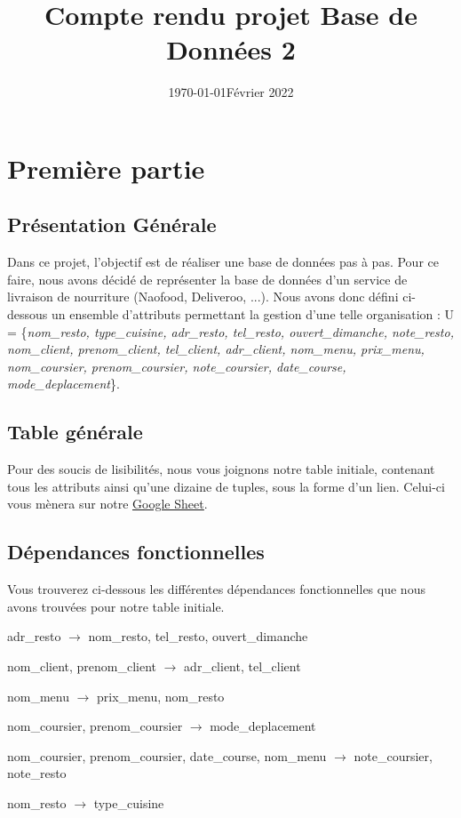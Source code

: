 \documentclass[french]{article}
\date{\today}
\title{Compte rendu projet Base de Données 2}
\author{\bsc{Billaud Maël} \and \bsc{Johan Quentin} \and \bsc{Ramé Tristan} \and \bsc{Goubon Valentin}}
\date{Février 2022}
\begin{document}


\maketitle

\section{Première partie}
    \subsection*{Présentation Générale}
        Dans ce projet, l'objectif est de réaliser une base de données pas à pas. Pour ce faire, nous avons décidé de représenter la base de données d'un service de livraison de nourriture (Naofood, Deliveroo, ...). Nous avons donc défini ci-dessous un ensemble d'attributs permettant la gestion d'une telle organisation :\newline 
        U = \{\emph{nom\_resto, type\_cuisine, adr\_resto, tel\_resto, ouvert\_dimanche, note\_resto, nom\_client, prenom\_client, tel\_client, adr\_client, nom\_menu, prix\_menu, nom\_coursier, prenom\_coursier, note\_coursier, date\_course, mode\_deplacement}\}.
        

    \subsection*{Table générale}
        Pour des soucis de lisibilités, nous vous joignons notre table initiale, contenant tous les attributs ainsi qu'une dizaine de tuples, sous la forme d'un lien. Celui-ci vous mènera sur notre 
        \href{https://docs.google.com/spreadsheets/d/1HeSNFvLN3-yMfWHoYLVumzOeQpHXJHynqVBusbvl6EQ/edit?usp=sharing}{\underline{Google Sheet}}.
    
    
    
    \subsection*{Dépendances fonctionnelles}
        Vous trouverez ci-dessous les différentes dépendances fonctionnelles que nous avons trouvées pour notre table initiale.
        \begin{df}
            \item adr\_resto $\rightarrow$ nom\_resto, tel\_resto, ouvert\_dimanche
            \item nom\_client, prenom\_client $\rightarrow$ adr\_client, tel\_client
            \item nom\_menu $\rightarrow$ prix\_menu, nom\_resto
            \item nom\_coursier, prenom\_coursier $\rightarrow$  mode\_deplacement
            \item nom\_coursier, prenom\_coursier, date\_course, nom\_menu $\rightarrow$ note\_coursier, note\_resto
            \item nom\_resto $\rightarrow$ type\_cuisine
        \end{df}
        
\end{document}
